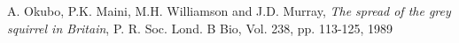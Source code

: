 \documentclass[10pt]{amsart}
\theoremstyle{definition}
\begin{document}
\begin{thebibliography}{}
 A. Okubo, P.K. Maini, M.H. Williamson and J.D. Murray,
\newblock \emph{The spread of the grey squirrel in Britain},
\newblock P. R. Soc. Lond. B Bio, Vol. 238, pp. 113-125, 1989


%
%
%
%
%
%
%
%
%
%
%



\end{thebibliography}
\end{document}
